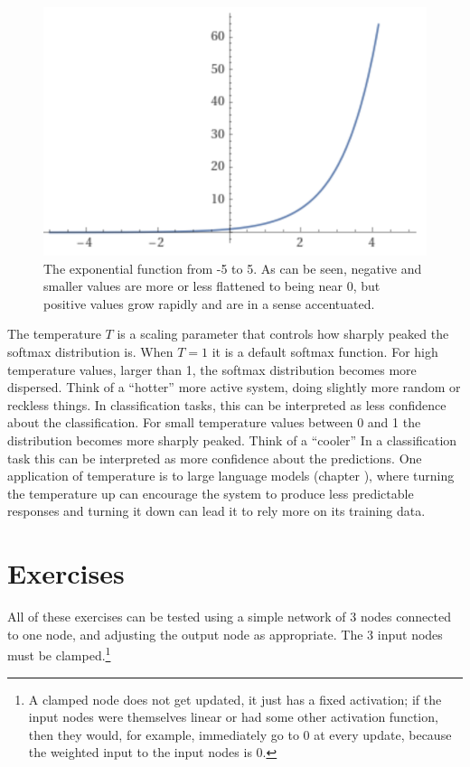 \begin{figure}[h]
\centering
\includegraphics[scale=.5]{./images/exponentialFunction.png}
\caption[Jeff Yoshimi using Wolfram Alpha.]{The exponential function from -5 to 5. As can be seen, negative and smaller values are more or less flattened to being near 0, but positive values grow rapidly and are in a sense accentuated.}
\label{exponentiation}
\end{figure}

The temperature $T$ is a scaling parameter that controls how sharply peaked the softmax distribution is. When $T=1$ it is a default softmax function.  For high temperature values, larger than 1, the softmax distribution becomes more dispersed. Think of a ``hotter'' more active system, doing slightly more random or reckless things. In classification tasks, this can be interpreted as less confidence about the classification.  For small temperature values between 0 and 1 the distribution becomes more sharply peaked. Think of a ``cooler'' In a classification task this can be interpreted as more confidence about the predictions.  One application of temperature is to large language models (chapter ), where turning the temperature up can encourage the system to produce less predictable responses and turning it down can lead it to rely more on its training data.


\section{Exercises}\label{activation_function_exercises}

   All of these exercises can be tested using a simple network of 3 nodes connected to one node, and 
adjusting the output node as appropriate. The 3 input nodes must be clamped.\footnote{A clamped node does not get updated, it just has a fixed activation; if the input nodes were themselves linear or had some other activation function, then they would, for example, immediately go to 0 at every update, because the weighted input to the input nodes is 0.}
\bigskip

